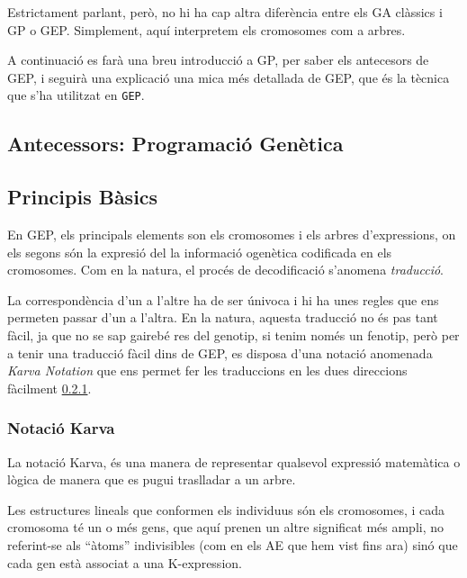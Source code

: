 \documentclass[titlepage,a4paper,12pt]{book}
\begin{document}
Estrictament parlant, però, no hi ha cap altra diferència entre els GA clàssics
i GP o GEP.  Simplement, aquí interpretem els cromosomes com a arbres.

A continuació es farà una breu introducció a GP, per saber els antecesors de
GEP, i seguirà una explicació una mica més detallada de GEP, que és la tècnica
que s'ha utilitzat en \texttt{GEP}.

\subsection{Antecessors: Programació Genètica} %
\label{sub:Ant. Programacio Genetica}


\subsection{Principis Bàsics} %
\label{sub:Principis Basics}

En GEP, els principals elements son els cromosomes i els arbres d'expressions,
on els segons són la expresió del la informació ogenètica codificada en els
cromosomes.  Com en la natura, el procés de decodificació s'anomena
\emph{traducció}.

La correspondència d'un a l'altre ha de ser únivoca i hi ha unes regles que ens
permeten passar d'un a l'altra.  En la natura, aquesta traducció no és pas tant
fàcil, ja que no se sap gairebé res del genotip, si tenim només un fenotip, però
per a tenir una traducció fàcil dins de GEP, es disposa d'una notació anomenada
\emph{Karva Notation} que ens permet fer les traduccions en les dues direccions
fàcilment \ref{ssub:Notacio Karva}.


\subsubsection{Notació Karva} %
\label{ssub:Notacio Karva}

La notació Karva, és una manera de representar qualsevol expressió matemàtica o
lògica de manera que es pugui traslladar a un arbre.\cite{ferreira:2001}

Les estructures lineals que conformen els individuus són els cromosomes, i cada
cromosoma té un o més gens, que aquí prenen un altre significat més ampli, no
referint-se als ``àtoms'' indivisibles (com en els AE que hem vist fins ara)
sinó que cada gen està associat a una K-expression. \cite{ferreira:2007}
\end{document}
